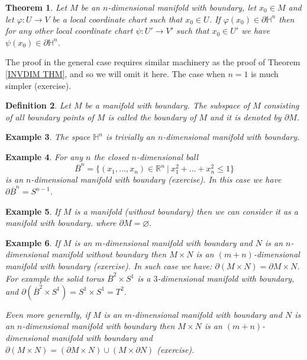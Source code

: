 \documentclass[11pt, letterpaper, oneside]{report}
\theoremstyle{pplain}
\newtheorem{theorem}{Theorem}[chapter]
\newtheorem{ITERMVALUE THM}[theorem]{Intermediate Value Theorem}
\newtheorem{HEINEBOREL THM}[theorem]{Heine-Borel Theorem}
\newtheorem{UMETR THM}[theorem]{Urysohn Metrization Theorem}
\newtheorem{UMETR2 THM}[theorem]{Urysohn Metrization Theorem (v.2)}
\theoremstyle{ddefinition}
\newtheorem{definition}[theorem]{Definition}
\newtheorem{example}[theorem]{Example}
\theoremstyle{nnn}
\newtheorem{TDA NN}[theorem]{Topological Data Analysis. }
\theoremstyle{eexercise}
\newcommand{\R}{{\mathbb R}}
\newcommand{\HH}{{\mathbb H}}
\begin{document}
\begin{theorem}
\label{INV BOUNDARY THM}
Let $M$ be an $n$-dimensional manifold with boundary, let $x_{0}\in M$ and  let $\varphi\colon U \to V$
be a local coordinate chart such that  $x_{0}\in U$. 
If $\varphi(x_{0}) \in \partial \HH^{n}$ then for any other local coordinate chart $\psi\colon U'\to V'$
such that $x_{0}\in U'$ we have $\psi(x_{0})\in \partial \HH^{n}$. 
\end{theorem}

The proof in the general case requires similar machinery as the proof of Theorem \ref{INVDIM THM}, and so 
we will omit it here. The case when $n=1$ is much simpler (exercise). 

\begin{definition}
Let $M$ be a manifold with boundary. The subspace of $M$ consisting of all boundary points of 
$M$ is called \emph{the boundary of $M$} and it is denoted by $\partial M$. 
\end{definition}

\begin{example}
The space $\HH^{n}$ is trivially an $n$-dimensional manifold with boundary. 
\end{example}

\begin{example}
\label{CLOSED BALL MFLD EXAMPLE}
For any $n$ the closed $n$-dimensional ball
$$\overline{B}^{n} = \{(x_{1}, \dots, x_{n})\in \R^{n} \ | \ x_{1}^{2}+\dots +x_{n}^{2} \leq 1\}$$
is an $n$-dimensional manifold with boundary (exercise). 
In this case we have $\partial \overline{B}^{n} = S^{n-1}$.  
\end{example}

\begin{example}
If $M$ is a manifold (without boundary) then we can consider  it as a manifold with boundary. 
where $\partial M = \varnothing$. 
\end{example}

\begin{example}
If $M$ is an $m$-dimensional manifold with boundary and $N$ is an $n$-dimensional manifold 
without boundary then $M\times N$ is an $(m+n)$-dimensional manifold with boundary (exercise). 
In such case we have: $\partial (M\times N) = \partial M \times N$. For example the \emph{solid torus} 
$\overline{B}^{2}\times S^{1}$ is a $3$-dimensional manifold with boundary, and 
$\partial (\overline{B}^{2}\times S^{1}) = S^{1}\times S^{1} = T^{2}$.   

Even more generally, if $M$ is an $m$-dimensional manifold with boundary and $N$ is 
an $n$-dimensional manifold with boundary then $M\times N$ is  an $(m+n)$-dimensional manifold 
with boundary and $\partial (M\times N) = (\partial M \times N) \cup (M \times \partial N)$ (exercise). 
\end{example}
\end{document}
